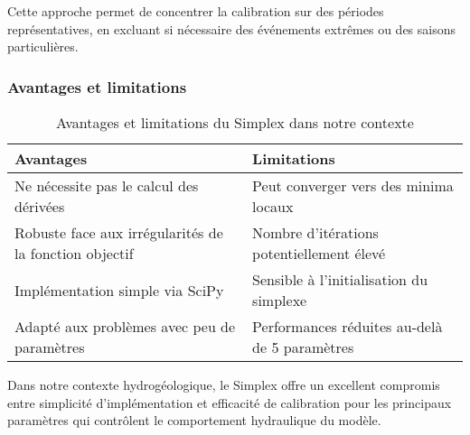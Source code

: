 Cette approche permet de concentrer la calibration sur des périodes représentatives, en excluant si nécessaire des événements extrêmes ou des saisons particulières.

\subsubsection{Avantages et limitations}

\begin{table}[h]
\centering
\caption{Avantages et limitations du Simplex dans notre contexte}
\label{tab:avantages_limitations}
\begin{tabular}{|p{7cm}|p{7cm}|}
\hline
\textbf{Avantages} & \textbf{Limitations} \\
\hline
Ne nécessite pas le calcul des dérivées & Peut converger vers des minima locaux \\
\hline
Robuste face aux irrégularités de la fonction objectif & Nombre d'itérations potentiellement élevé \\
\hline
Implémentation simple via SciPy & Sensible à l'initialisation du simplexe \\
\hline
Adapté aux problèmes avec peu de paramètres & Performances réduites au-delà de 5 paramètres \\
\hline
\end{tabular}
\end{table}

Dans notre contexte hydrogéologique, le Simplex offre un excellent compromis entre simplicité d'implémentation et efficacité de calibration pour les principaux paramètres qui contrôlent le comportement hydraulique du modèle.